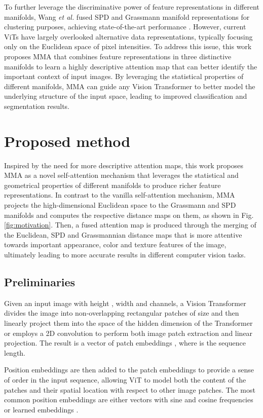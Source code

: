 \documentclass[10pt,twocolumn,letterpaper]{article}
\begin{document}
To further leverage the discriminative power of feature representations in different manifolds, Wang \emph{et al.} fused SPD and Grassmann manifold representations for clustering purposes, achieving state-of-the-art performance \cite{Author47}. However, current ViTs have largely overlooked alternative data representations, typically focusing only on the Euclidean space of pixel intensities. To address this issue, this work proposes MMA that combines feature representations in three distinctive manifolds to learn a highly descriptive attention map that can better identify the important context of input images. By leveraging the statistical properties of different manifolds, MMA can guide any Vision Transformer to better model the underlying structure of the input space, leading to improved classification and segmentation results.

\section{Proposed method}
\label{sec:method}

Inspired by the need for more descriptive attention maps, this work proposes MMA as a novel self-attention mechanism that leverages the statistical and geometrical properties of different manifolds to produce richer feature representations. In contrast to the vanilla self-attention mechanism, MMA projects the high-dimensional Euclidean space to the Grassmann and SPD manifolds and computes the respective distance maps on them, as shown in Fig. \ref{fig:motivation}. Then, a fused attention map is produced through the merging of the Euclidean, SPD and Grassmannian distance maps that is more attentive towards important appearance, color and texture features of the image, ultimately leading to more accurate results in different computer vision tasks.

\subsection{Preliminaries}

Given an input image  with height , width  and  channels, a Vision Transformer divides the image into non-overlapping rectangular patches of size  and then linearly project them into the space of the hidden dimension  of the Transformer or employs a 2D convolution to perform both image patch extraction and linear projection. The result is a vector of patch embeddings , where  is the sequence length.

Position embeddings are then added to the patch embeddings to provide a sense of order in the input sequence, allowing ViT to model both the content of the patches and their spatial location with respect to other image patches. The most common position embeddings are either vectors with sine and cosine frequencies \cite{Author3} or learned embeddings \cite{Author5,Author32}.
\end{document}
